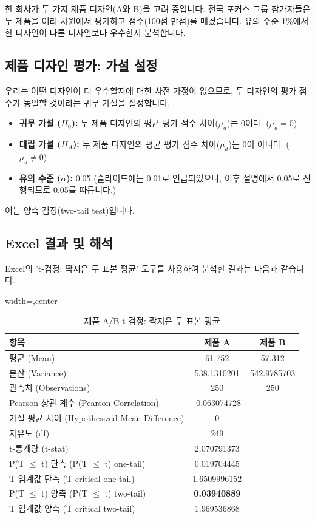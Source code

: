\documentclass[11pt,a4paper]{book}
\theoremstyle{definition}
\begin{document}
\begin{examplebox}[title=시나리오: 제품 디자인 평가]
한 회사가 두 가지 제품 디자인(A와 B)을 고려 중입니다. 전국 포커스 그룹 참가자들은 두 제품을 여러 차원에서 평가하고 점수(100점 만점)를 매겼습니다. 유의 수준 1\%에서 한 디자인이 다른 디자인보다 우수한지 분석합니다.
\end{examplebox}

\subsection{제품 디자인 평가: 가설 설정}
우리는 어떤 디자인이 더 우수할지에 대한 사전 가정이 없으므로, 두 디자인의 평가 점수가 동일할 것이라는 귀무 가설을 설정합니다.
\begin{itemize}
    \item \textbf{귀무 가설 ($H_0$):} 두 제품 디자인의 평균 평가 점수 차이($\mu_d$)는 0이다. ($\mu_d = 0$)
    \item \textbf{대립 가설 ($H_A$):} 두 제품 디자인의 평균 평가 점수 차이($\mu_d$)는 0이 아니다. ($\mu_d \ne 0$)
    \item \textbf{유의 수준 ($\alpha$):} 0.05 (슬라이드에는 0.01로 언급되었으나, 이후 설명에서 0.05로 진행되므로 0.05를 따릅니다.)
\end{itemize}
이는 양측 검정(two-tail test)입니다.

\subsection{Excel 결과 및 해석}
Excel의 't-검정: 짝지은 두 표본 평균' 도구를 사용하여 분석한 결과는 다음과 같습니다.

\begin{table}[h!]
\caption{제품 A/B t-검정: 짝지은 두 표본 평균}
\label{tab:product_ttest_paired}
\centering
\begin{adjustbox}{width=\textwidth,center}
\begin{tabular}{lcc}
\toprule
\textbf{항목} & \textbf{제품 A} & \textbf{제품 B} \\
\midrule
평균 (Mean) & 61.752 & 57.312 \\
분산 (Variance) & 538.1310201 & 542.9785703 \\
관측치 (Observations) & 250 & 250 \\
Pearson 상관 계수 (Pearson Correlation) & -0.063074728 & \\
가설 평균 차이 (Hypothesized Mean Difference) & 0 & \\
자유도 (df) & 249 & \\
t-통계량 (t-stat) & 2.070791373 & \\
P(T $\le$ t) 단측 (P(T $\le$ t) one-tail) & 0.019704445 & \\
T 임계값 단측 (T critical one-tail) & 1.6509996152 & \\
P(T $\le$ t) 양측 (P(T $\le$ t) two-tail) & \textbf{0.03940889} & \\
T 임계값 양측 (T critical two-tail) & 1.969536868 & \\
\bottomrule
\end{tabular}
\end{adjustbox}
\end{table}
\end{document}
